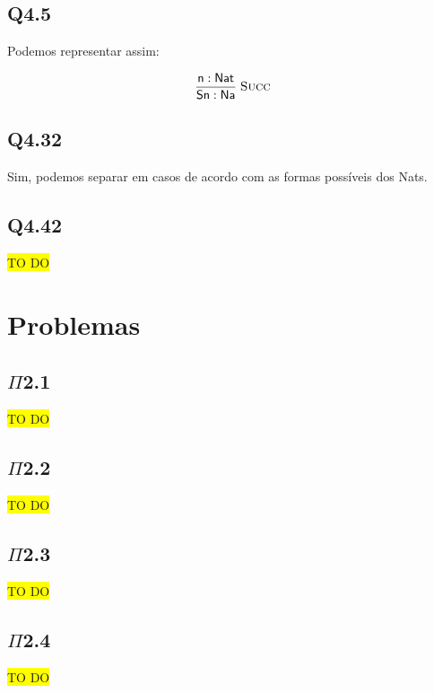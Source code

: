 \documentclass[portuguese,a4paper,12pt]{article}
\begin{document}
	\subsection*{Q4.5}
	
	Podemos representar assim:
	
	\[
	\mathsf{
	\frac{n : Nat}{S n : Na}\;\textsc{Succ}
    }
	\]
	
	\subsection*{Q4.32}
	
	Sim, podemos separar em casos de acordo com as formas possíveis dos Nats.
	
	\subsection*{Q4.42}
	
	\colorbox{yellow}{TO DO}
	
	\section*{\centering Problemas}
	
	\subsection*{$\Pi$2.1}
	
	\colorbox{yellow}{TO DO}
	
	\subsection*{$\Pi$2.2}
	
	\colorbox{yellow}{TO DO}
	
	\subsection*{$\Pi$2.3}
	
	\colorbox{yellow}{TO DO}
	
	\subsection*{$\Pi$2.4}
	
	\colorbox{yellow}{TO DO}
\end{document}
